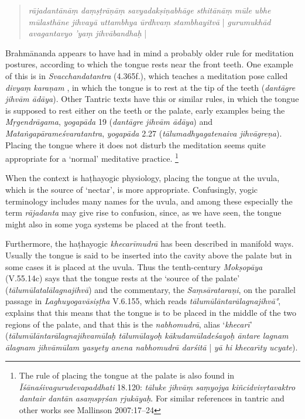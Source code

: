 \begin{ekdosis}
\begin{philcomm}[hp01_045]
\begin{quote}
\emph{rājadantānāṃ daṃṣṭrāṇāṃ savyadakṣiṇabhāge sthitānāṃ mūle ubhe mūlasthāne jihvayā uttambhya ūrdhvaṃ stambhayitvā} | \emph{gurumukhād avagantavyo 'yaṃ jihvābandhaḥ} |
\end{quote}
Brahmānanda appears to have had in mind a probably older rule for meditation postures, according to which the tongue rests near the front teeth. One example of this is in \emph{Svacchandatantra} (4.365f.), which teaches a meditation pose called \emph{divyaṃ karaṇam} , in which the tongue is to rest at the tip
of the teeth (\emph{dantāgre jihvām ādāya}). Other Tantric texts have this or similar rules, in which the tongue is supposed to rest either on the teeth or the palate, early examples being the \emph{Mṛgendrāgama}, \textit{yogapāda} 19 (\emph{dantāgre jihvām ādāya}) and \emph{Mataṅgapārameśvaratantra}, \textit{yogapāda} 2.27 (\emph{tālumadhyagatenaiva jihvāgreṇa}). Placing the tongue where it does not disturb the meditation seems quite appropriate for a `normal' meditative practice. \footnote{The rule of placing the tongue at the palate is also found in \emph{Īśānaśivagurudevapaddhati} 18.120: \emph{tāluke jihvāṃ saṃyojya kiñcidvivṛtavaktro dantair dantān asaṃspṛśan ṛjukāyaḥ}. For similar references in tantric and other works see Mallinson 2007:17–24}

When the context is haṭhayogic physiology, placing the tongue at the uvula, which is the source of `nectar', is more appropriate. Confusingly, yogic terminology includes many names for the uvula, and among these especially the term \emph{rājadanta} may give rise to confusion, since, as we have seen, the tongue might also in some yoga systems be placed at the front teeth.

Furthermore, the haṭhayogic \emph{khecarīmudrā} has been described in manifold ways. Usually the tongue is said to be inserted into the cavity above the palate but in some cases it is placed at the uvula. Thus the tenth-century \emph{Mokṣopāya} (V.55.14c) says that the tongue rests at the `source of the palate' (\emph{tālumūlatalālagnajihvā}) and the commentary, the
\emph{Saṃsārataraṇi}, on the parallel passage in \emph{Laghuyogavāsiṣṭha} V.6.155, which reads \emph{tālumūlāntarālagnajihvā°}, explains that this means that the tongue is to be placed in the middle of the two regions of the palate, and that this is the \emph{nabhomudrā}, alias `\emph{khecarī}' (\emph{tālumūlāntarālagnajihvamūlaḥ tālumūlayoḥ kākudamūladeśayoḥ āntare lagnam ālagnam jihvāmūlam yasyety anena nabhomudrā darśitā} | \emph{yā hi khecarı̄ty ucyate}).


\end{philcomm}
\end{ekdosis}
